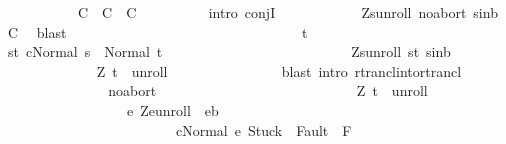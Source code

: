 \begin{isabellebody}
\ \ \ \ \ \ \ \ \ \ {\isacharparenleft}\ {\isachardoublequoteopen}{\isacharquery}C{}\ {\isasymand}\ {\isacharquery}C{}\ {\isasymand}\ {\isacharquery}C{}{\isachardoublequoteclose}{\isacharparenright}\isanewline
\ \ \ \ \ \ \ \ \isamarkupfalse%
\ {\isacharparenleft}intro\ conjI{\isacharparenright}\isanewline
\ \ \ \ \ \ \ \ \ \ \isamarkupfalse%
\ Z{\isacharunderscore}s{\isacharunderscore}unroll\ noabort\ s{\isacharunderscore}in{\isacharunderscore}b\ \isamarkupfalse%
\ {\isacharquery}C{}\ \isamarkupfalse%
\ blast\isanewline
\ \ \ \ \ \ \ \ \isamarkupfalse%
\isanewline
\ \ \ \ \ \ \ \ \ \ \isacommand{{\isacharbraceleft}}\isamarkupfalse%
\isanewline
\ \ \ \ \ \ \ \ \ \ \ \ \isamarkupfalse%
\ t\ \isanewline
\ \ \ \ \ \ \ \ \ \ \ \ \isamarkupfalse%
\ s{\isacharunderscore}t{\isacharcolon}\ {\isachardoublequoteopen}{\isasymGamma}{\isasymturnstile}{\isasymlangle}c{\isacharcomma}Normal\ s{\isasymrangle}\ {\isasymRightarrow}\ Normal\ t{\isachardoublequoteclose}\isanewline
\ \ \ \ \ \ \ \ \ \ \ \ \isamarkupfalse%
\isanewline
\ \ \ \ \ \ \ \ \ \ \ \ \isamarkupfalse%
\ Z{\isacharunderscore}s{\isacharunderscore}unroll\ s{\isacharunderscore}t\ s{\isacharunderscore}in{\isacharunderscore}b\ \isanewline
\ \ \ \ \ \ \ \ \ \ \ \ \isamarkupfalse%
\ {\isachardoublequoteopen}{\isacharparenleft}Z{\isacharcomma}\ t{\isacharparenright}\ {\isasymin}\ {\isacharquery}unroll{\isachardoublequoteclose}\isanewline
\ \ \ \ \ \ \ \ \ \ \ \ \ \ \isamarkupfalse%
\ {\isacharparenleft}blast\ intro{\isacharcolon}\ rtrancl{\isacharunderscore}into{\isacharunderscore}rtrancl{\isacharparenright}\isanewline
\ \ \ \ \ \ \ \ \ \ \ \ \isamarkupfalse%
\ \isamarkupfalse%
\ noabort\isanewline
\ \ \ \ \ \ \ \ \ \ \ \ \isamarkupfalse%
\ \isanewline
\ \ \ \ \ \ \ \ \ \ \ \ \isamarkupfalse%
\ {\isachardoublequoteopen}{\isacharparenleft}Z{\isacharcomma}\ t{\isacharparenright}\ {\isasymin}\ {\isacharquery}unroll\ {\isasymand}\ \isanewline
\ \ \ \ \ \ \ \ \ \ \ \ \ \ \ \ \ \ {\isacharparenleft}{\isasymforall}e{\isachardot}\ {\isacharparenleft}Z{\isacharcomma}e{\isacharparenright}{\isasymin}{\isacharquery}unroll\ {\isasymlongrightarrow}\ e{\isasymin}b\isanewline
\ \ \ \ \ \ \ \ \ \ \ \ \ \ \ \ \ \ \ \ \ \ \ \ {\isasymlongrightarrow}\ {\isasymGamma}{\isasymturnstile}{\isasymlangle}c{\isacharcomma}Normal\ e{\isasymrangle}\ {\isasymRightarrow}{\isasymnotin}{\isacharparenleft}{\isacharbraceleft}Stuck{\isacharbraceright}\ {\isasymunion}\ Fault\ {\isacharbackquote}\ {\isacharparenleft}{\isacharminus}F{\isacharparenright}{\isacharparenright}\ {\isasymand}\ \isanewline

\end{isabellebody}
